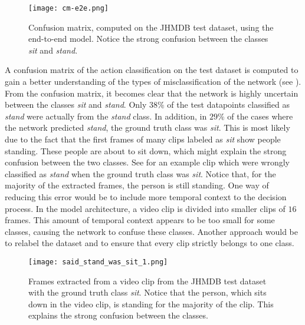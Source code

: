 \begin{figure}[htb!]
    \centering
    \texttt{[image: cm-e2e.png]}
    \caption{Confusion matrix, computed on the JHMDB test dataset, using the end-to-end model. Notice the strong confusion between the classes \textit{sit} and \textit{stand}.}
    \label{fig:cm-e2e}
\end{figure}

A confusion matrix of the action classification on the test dataset is computed to gain a better understanding of the types of misclassification of the network (see ).
From the confusion matrix, it becomes clear that the network is highly uncertain between the classes \textit{sit} and \textit{stand}.
Only $38\%$ of the test datapoints classified as \textit{stand} were actually from the \textit{stand} class.
In addition, in $29\%$ of the cases where the network predicted \textit{stand}, the ground truth class was \textit{sit}.
This is most likely due to the fact that the first frames of many clips labeled as \textit{sit} show people standing.
These people are about to sit down, which might explain the strong confusion between the two classes.
See  for an example clip which were wrongly classified as \textit{stand} when the ground truth class was \textit{sit}.
Notice that, for the majority of the extracted frames, the person is still standing.
One way of reducing this error would be to include more temporal context to the decision process.
In the model architecture, a video clip is divided into smaller clips of $16$ frames.
This amount of temporal context appears to be too small for some classes, causing the network to confuse these classes.
Another approach would be to relabel the dataset and to ensure that every clip strictly belongs to one class.

\begin{figure}[htb!]
    \centering
    \texttt{[image: said\_stand\_was\_sit\_1.png]}
    \caption{Frames extracted from a video clip from the JHMDB test dataset with the ground truth class \textit{sit}. Notice that the person, which sits down in the video clip, is standing for the majority of the clip. This explains the strong confusion between the classes.}
    \label{fig:e2e-confusion}
\end{figure}

